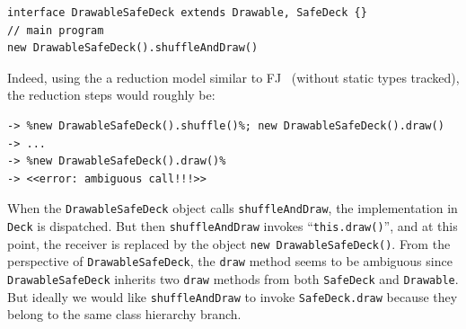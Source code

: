 \vspace{3pt}\begin{lstlisting}
interface DrawableSafeDeck extends Drawable, SafeDeck {}
// main program
new DrawableSafeDeck().shuffleAndDraw()
\end{lstlisting}\vspace{3pt}

\noindent Indeed, using the a reduction model similar to FJ~\cite{Igarashi01FJ} (without static types tracked), the reduction steps would roughly be:


\vspace{3pt}\begin{lstlisting}[style=reduction, escapechar=\%]
   %new DrawableSafeDeck()%.shuffleAndDraw()
-> %new DrawableSafeDeck().shuffle()%; new DrawableSafeDeck().draw()
-> ...
-> %new DrawableSafeDeck().draw()%
-> <<error: ambiguous call!!!>>
\end{lstlisting}\vspace{3pt}

\noindent When the \lstinline|DrawableSafeDeck| object calls \lstinline|shuffleAndDraw|, the implementation in \lstinline|Deck|
is dispatched. But then \lstinline|shuffleAndDraw| invokes ``\lstinline|this.draw()|'', and at this point, the receiver
is replaced by the object \lstinline|new DrawableSafeDeck()|.
From the perspective of \lstinline|DrawableSafeDeck|, the
\lstinline|draw| method seems to be ambiguous since
\lstinline|DrawableSafeDeck| inherits two \lstinline|draw| methods from
both \lstinline|SafeDeck| and \lstinline|Drawable|. 
But ideally we would
like \lstinline|shuffleAndDraw| to invoke \lstinline|SafeDeck.draw|
because they belong to the same class hierarchy branch.

